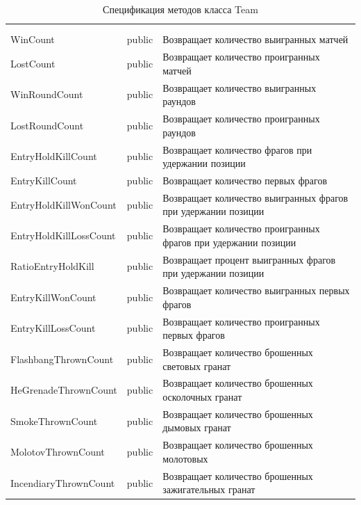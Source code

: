 \begin{xltabular}{\textwidth}{|X|c|X|}
	\caption{Спецификация методов класса Team}\label{table:TeamMethods}\\ \hline
	 &  &  \\ \hline
	 &  &  \\ \hline
	\endfirsthead
	 \hline
	 &  &  \\ \hline
	\endhead
	WinCount & public & Возвращает количество выигранных матчей \\ \hline
	LostCount & public & Возвращает количество проигранных матчей \\ \hline
	WinRoundCount & public & Возвращает количество выигранных раундов \\ \hline
	LostRoundCount & public & Возвращает количество проигранных раундов \\ \hline
	EntryHoldKillCount & public & Возвращает количество фрагов при удержании позиции \\ \hline
	EntryKillCount & public & Возвращает количество первых фрагов \\ \hline
	EntryHoldKillWonCount & public & Возвращает количество выигранных фрагов при удержании позиции \\ \hline
	EntryHoldKillLossCount & public & Возвращает количество проигранных фрагов при удержании позиции \\ \hline
	RatioEntryHoldKill & public & Возвращает процент выигранных фрагов при удержании позиции \\ \hline
	EntryKillWonCount & public & Возвращает количество выигранных первых фрагов \\ \hline
	EntryKillLossCount & public & Возвращает количество проигранных первых фрагов \\ \hline
	FlashbangThrownCount & public & Возвращает количество брошенных световых гранат \\ \hline
	HeGrenadeThrownCount & public & Возвращает количество брошенных осколочных гранат \\ \hline
	SmokeThrownCount & public & Возвращает количество брошенных дымовых гранат \\ \hline
	MolotovThrownCount & public & Возвращает количество брошенных молотовых \\ \hline
	IncendiaryThrownCount & public & Возвращает количество брошенных зажигательных гранат \\ \hline

\end{xltabular}
